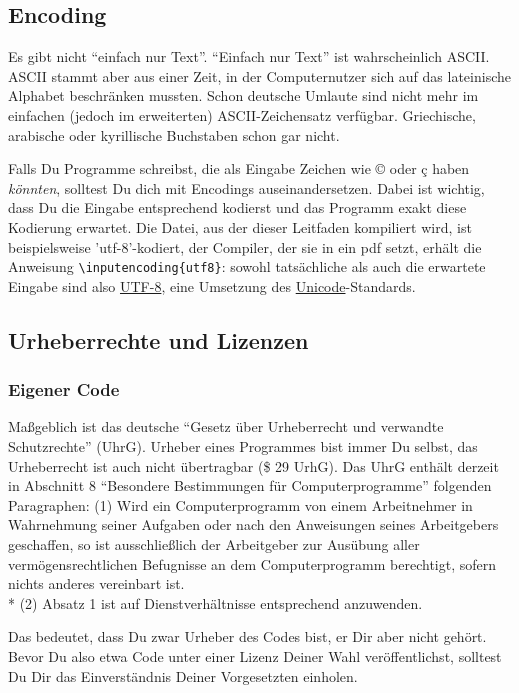 \documentclass[twoside]{scrartcl}
\begin{document}
\subsection{Encoding}
Es gibt nicht "`einfach nur Text"'. "`Einfach nur Text"' ist wahrscheinlich
ASCII. ASCII stammt aber aus einer Zeit, in der Computernutzer sich auf das
lateinische Alphabet beschr\"a{}nken mussten. Schon deutsche Umlaute sind nicht
mehr im einfachen (jedoch im erweiterten) ASCII-Zeichensatz verf\"u{}gbar.
Griechische, arabische oder kyrillische Buchstaben schon gar nicht. 


Falls Du Programme schreibst, die als Eingabe Zeichen wie ©  oder ç haben
\emph{k\"o{}nnten}, solltest Du dich mit Encodings auseinandersetzen. Dabei 
ist wichtig, dass Du die Eingabe entsprechend kodierst und das Programm exakt
diese Kodierung erwartet. Die Datei, aus der dieser Leitfaden kompiliert
wird, ist beispielsweise 'utf-8'-kodiert, der Compiler, der sie in ein pdf 
setzt, erh\"a{}lt die Anweisung \verb+\inputencoding{utf8}+: sowohl 
tats\"a{}chliche als auch die erwartete Eingabe sind also 
\href{http://en.wikipedia.org/wiki/UTF-8}{UTF-8}, eine Umsetzung des
\href{http://en.wikipedia.org/wiki/Unicode}{Unicode}-Standards.
\subsection{Urheberrechte und Lizenzen}
\subsubsection{Eigener Code}
Ma\ss{}geblich ist das deutsche "`Gesetz \"u{}ber Urheberrecht und verwandte
Schutzrechte"' (UhrG). 
Urheber eines Programmes bist immer Du selbst, das Urheberrecht ist auch nicht
\"u{}bertragbar (\$ 29 UrhG).
Das UhrG enth\"a{}lt derzeit in Abschnitt 8 "`Besondere Bestimmungen
f\"u{}r 
Computerprogramme"' folgenden Paragraphen:
(1) Wird ein Computerprogramm von einem Arbeitnehmer in Wahrnehmung seiner
Aufgaben oder nach den Anweisungen seines Arbeitgebers geschaffen, so ist
ausschlie\ss{}lich der Arbeitgeber zur Aus\"u{}bung aller 
verm\"o{}gensrechtlichen Befugnisse an dem Computerprogramm berechtigt, sofern 
nichts anderes vereinbart ist.\\*
(2) Absatz 1 ist auf Dienstverh\"a{}ltnisse entsprechend anzuwenden.

Das bedeutet, dass Du zwar Urheber des Codes bist, er Dir aber nicht
geh\"o{}rt. Bevor Du also etwa Code unter einer Lizenz Deiner Wahl
ver\"o{}ffentlichst, solltest Du Dir das Einverst\"a{}ndnis Deiner Vorgesetzten 
einholen.
\end{document}
